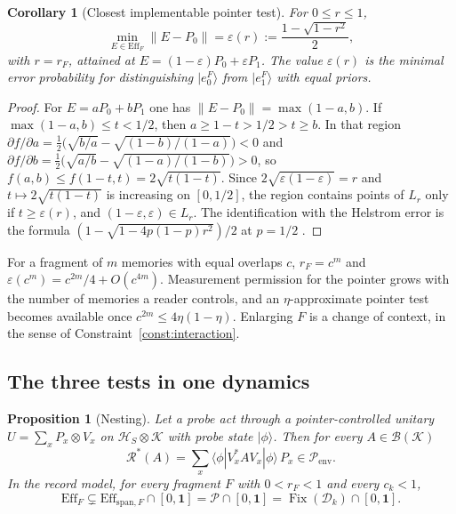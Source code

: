 \documentclass[12pt,a4paper]{article}
\newtheorem{proposition}[theorem]{Proposition}
\newtheorem{corollary}[theorem]{Corollary}
\begin{document}
\begin{corollary}[Closest implementable pointer test]
\label{cor:closest}
For $0\le r\le1$,
\[
\min_{E\in\mathrm{Eff}_F}\|E-P_0\|=\varepsilon(r):=\frac{1-\sqrt{1-r^2}}{2},
\]
with $r=r_F$, attained at $E=(1-\varepsilon)P_0+\varepsilon P_1$. The value $\varepsilon(r)$ is the minimal error probability for distinguishing $|e_0^F\rangle$ from $|e_1^F\rangle$ with equal priors.
\end{corollary}

\begin{proof}
For $E=aP_0+bP_1$ one has $\|E-P_0\|=\max(1-a,b)$. If $\max(1-a,b)\le t<1/2$, then $a\ge1-t>1/2>t\ge b$. In that region $\partial f/\partial a=\tfrac12\bigl(\sqrt{b/a}-\sqrt{(1-b)/(1-a)}\bigr)<0$ and $\partial f/\partial b=\tfrac12\bigl(\sqrt{a/b}-\sqrt{(1-a)/(1-b)}\bigr)>0$, so $f(a,b)\le f(1-t,t)=2\sqrt{t(1-t)}$. Since $2\sqrt{\varepsilon(1-\varepsilon)}=r$ and $t\mapsto2\sqrt{t(1-t)}$ is increasing on $[0,1/2]$, the region contains points of $L_r$ only if $t\ge\varepsilon(r)$, and $(1-\varepsilon,\varepsilon)\in L_r$. The identification with the Helstrom error is the formula $(1-\sqrt{1-4p(1-p)r^2})/2$ at $p=1/2$ \cite{Helstrom1976}.
\end{proof}

For a fragment of $m$ memories with equal overlaps $c$, $r_F=c^m$ and $\varepsilon(c^m)=c^{2m}/4+O(c^{4m})$. Measurement permission for the pointer grows with the number of memories a reader controls, and an $\eta$-approximate pointer test becomes available once $c^{2m}\le4\eta(1-\eta)$. Enlarging $F$ is a change of context, in the sense of Constraint~\ref{const:interaction}.

\subsection{The three tests in one dynamics}

\begin{proposition}[Nesting]
\label{prop:nesting}
Let a probe act through a pointer-controlled unitary $U=\sum_xP_x\otimes V_x$ on $\mathcal H_S\otimes\mathcal K$ with probe state $|\phi\rangle$. Then for every $A\in\mathcal B(\mathcal K)$
\[
\mathcal R^*(A)=\sum_x\langle\phi|V_x^*AV_x|\phi\rangle\,P_x\in\mathcal P_{\mathrm{env}}.
\]
In the record model, for every fragment $F$ with $0<r_F<1$ and every $c_k<1$,
\[
\mathrm{Eff}_F\subsetneq\mathrm{Eff}_{\mathrm{span},F}\cap[0,\mathbf1]=\mathcal P\cap[0,\mathbf1]=\operatorname{Fix}(\mathcal D_k)\cap[0,\mathbf1].
\]
\end{proposition}
\end{document}
